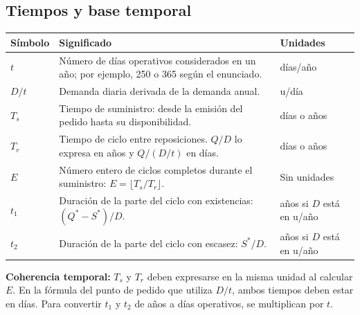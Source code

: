 \documentclass[11pt,a4paper]{article}
\begin{document}
\subsection{Tiempos y base temporal}
\begin{longtable}{@{}p{2cm}p{8cm}p{3.5cm}@{}}
    \toprule
    Símbolo & Significado                                                                                  & Unidades                  \\
    \midrule
    \endhead
    $t$     & Número de días operativos considerados en un año; por ejemplo, 250 o 365 según el enunciado. & días/año                  \\
    $D/t$   & Demanda diaria derivada de la demanda anual.                                                 & u/día                     \\
    $T_s$   & Tiempo de suministro: desde la emisión del pedido hasta su disponibilidad.                   & días o años               \\
    $T_r$   & Tiempo de ciclo entre reposiciones. $Q/D$ lo expresa en años y $Q/(D/t)$ en días.            & días o años               \\
    $E$     & Número entero de ciclos completos durante el suministro: $E=\lfloor T_s/T_r\rfloor$.         & Sin unidades              \\
    $t_1$   & Duración de la parte del ciclo con existencias: $(Q^{*}-S^{*})/D$.                           & años si $D$ está en u/año \\
    $t_2$   & Duración de la parte del ciclo con escasez: $S^{*}/D$.                                       & años si $D$ está en u/año \\
    \bottomrule
\end{longtable}
\textbf{Coherencia temporal:} $T_s$ y $T_r$ deben expresarse en la misma unidad al calcular $E$. En la fórmula del punto de pedido que utiliza $D/t$, ambos tiempos deben estar en días. Para convertir $t_1$ y $t_2$ de años a días operativos, se multiplican por $t$.
\end{document}
